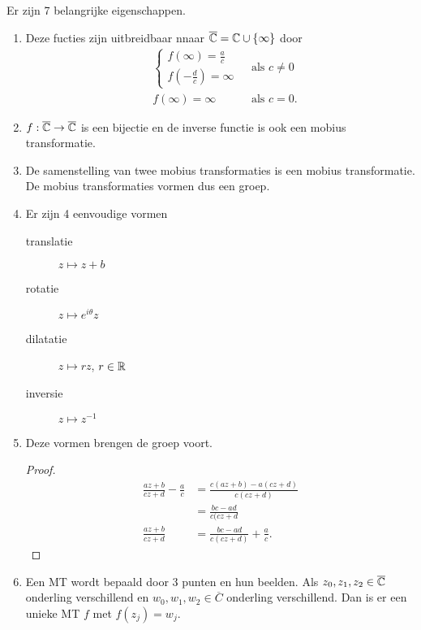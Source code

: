 \begin{opmerking}
	Er zijn 7 belangrijke eigenschappen.
	\begin{enumerate}
		\item Deze fucties zijn uitbreidbaar nnaar $\overline{\mathbb{C}} = \mathbb{C} \cup \{\infty\} $ door 
			\begin{align*}
				&\begin{cases}
					f(\infty) = \frac{a}{c} \\
					f\left(-\frac{d}{c}\right) = \infty
				\end{cases} &\text{ als } c\ne 0 
				\\
				&f(\infty) = \infty &\text{ als } c = 0
			.\end{align*}
		\item $f: \overline{\mathbb{C}} \to \overline{\mathbb{C}}$ is een bijectie en de inverse functie is ook een mobius transformatie.
		\item De samenstelling van twee mobius transformaties is een mobius transformatie.
			De mobius transformaties vormen dus een groep.
		\item Er zijn 4 eenvoudige vormen 
			\begin{description}
				\item[translatie] $z\mapsto z + b$ 
				\item [rotatie] $z\mapsto e^{i\theta} z$ 
				\item [dilatatie] $z\mapsto rz$, $r \in \mathbb{R}$ 
				\item[inversie] $z \mapsto z^{-1}$
			\end{description}
		\item Deze vormen brengen de groep voort. 
			\begin{proof}
				\begin{align*}
					\frac{az + b}{cz + d} - \frac{a}{c} &= \frac{c(az+ b) - a(cz+ d)}{c(cz + d)} \\
									    &= \frac{bc - ad}{c(cz + d} \\
					\frac{az + b}{cz + d} &= \frac{bc - ad}{c(cz + d)} + \frac{a}{c}
				.\end{align*}
			\end{proof}
		\item Een MT wordt bepaald door 3 punten en hun beelden.
			Als  $z_0, z_1, z_2 \in \overline{\mathbb{C}}$ onderling verschillend en $w_0, w_1, w_2 \in \overline{C}$ onderling verschillend. Dan is er een unieke MT $f$ met $f(z_j) = w_j$.


\end{enumerate}
\end{opmerking}
